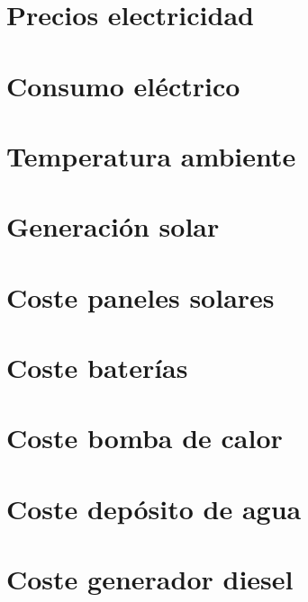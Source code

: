 \section{Precios electricidad}


\clearpage
\section{Consumo eléctrico}


\clearpage
\section{Temperatura ambiente}
\label{sec:temperatura_ambiente}


\clearpage
\section{Generación solar}


\clearpage
\section{Coste paneles solares}


\clearpage
\section{Coste baterías}


\clearpage
\section{Coste bomba de calor}


\clearpage
\section{Coste depósito de agua}


\clearpage
\section{Coste generador diesel}

